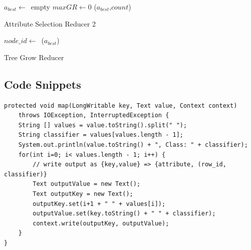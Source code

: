 \documentclass{article}
\begin{document}

\IncMargin{1em}
\begin{algorithm}[H]
\DontPrintSemicolon
{}
\BlankLine
$a_{best}\leftarrow$\ empty\;
$maxGR\leftarrow 0$\;
\emit(${a_{best}}$,$count$)
\caption{Attribute Selection Reducer 2\label{algo:atred}}
\end{algorithm}
\DecMargin{1em}



\IncMargin{1em}
\begin{algorithm}[H]
\DontPrintSemicolon
{}
\BlankLine
$node\_id\leftarrow$\ \hash(${a_{best}}$)\;
\caption{Tree Grow Reducer\label{algo:atred}}
\end{algorithm}
\DecMargin{1em}


\subsection{Code Snippets}


\begin{lstlisting}[caption={Attrib Table Mapper code snippet},label={lst:attrtblmap},style=MyJavaStyle]
protected void map(LongWritable key, Text value, Context context)
    throws IOException, InterruptedException {
    String [] values = value.toString().split(" ");
    String classifier = values[values.length - 1];
    System.out.println(value.toString() + ", Class: " + classifier);
    for(int i=0; i< values.length - 1; i++) {
        // write output as {key,value} => {attribute, (row_id, classifier)}
        Text outputValue = new Text();
        Text outputKey = new Text();
        outputKey.set(i+1 + " " + values[i]);
        outputValue.set(key.toString() + " " + classifier);
        context.write(outputKey, outputValue);
    }
}
\end{lstlisting}
\end{document}
